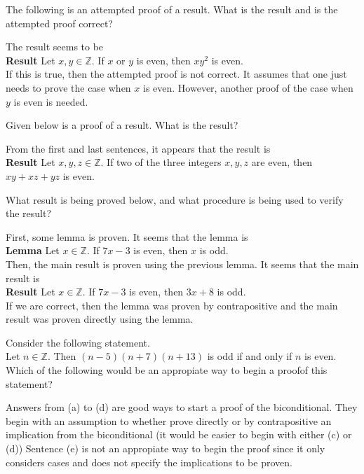 \documentclass[12pt]{article}
\newcommand{\Z}{\mathbb{Z}}
\newenvironment{problem}[2][Problem]{\begin{trivlist}
		\item[\hskip \labelsep {\bfseries #1}\hskip \labelsep {\bfseries #2.}]}{\end{trivlist}}
\newenvironment{solution}[2][Solution]{\begin{trivlist}
		\item[\hskip \labelsep {\bfseries #1}\hskip \labelsep {\bfseries #2.}]}{\end{trivlist}}
\begin{document}
	\begin{problem}{41}
		The following is an attempted proof of a result. What is the result and is the attempted proof correct?
		\begin{solution}{}
			The result seems to be\\
			
			\textbf{Result} Let $x,y\in \Z$. If $x$ or $y$ is even, then $xy^{2}$ is even.\\
			
			If this is true, then the attempted proof is not correct. It assumes that one just needs to prove the case when $x$ is even. However, another proof of the case when $y$ is even is needed.
		\end{solution}
	\end{problem}

	\begin{problem}{42}
		Given below is a proof of a result. What is the result?
		\begin{solution}{}
			From the first and last sentences, it appears that the result is\\
			\textbf{Result } Let $x,y,z\in \Z$. If two of the three integers $x,y,z$ are even, then $xy+xz+yz$ is even.
		\end{solution}
	\end{problem}
	
	\begin{problem}{43}
		What result is being proved below, and what procedure is being used to verify the result?
		\begin{solution}{}
			First, some lemma is proven. It seems that the lemma is\\ 
			
			\textbf{Lemma } Let $x\in\Z$. If $7x-3$ is even, then $x$ is odd.\\
			
			Then, the main result is proven using the previous lemma. It seems that the main result is\\
			\textbf{Result } Let $x\in \Z$. If $7x -3$ is even, then $3x+8$ is odd.\\
			
			If we are correct, then the lemma was proven by contrapositive and the main result was proven directly using the lemma.
		\end{solution}
	\end{problem}

	\begin{problem}{44}
		Consider the following statement.\\ 
		Let $n\in \Z$. Then $(n-5)(n+7)(n+13)$ is odd if and only if $n$ is even.
		Which of the following would be an appropiate way to begin a proofof this statement?
		\begin{solution}{} 
			Answers from (a) to (d) are good ways to start a proof of the biconditional. They begin with an assumption to whether prove directly or by contrapositive an implication from the biconditional (it would be easier to begin with either (c) or (d)) Sentence (e) is not an appropiate way to begin the proof since it only considers cases and does not specify the implications to be proven.
		\end{solution}
	\end{problem}
\end{document}

